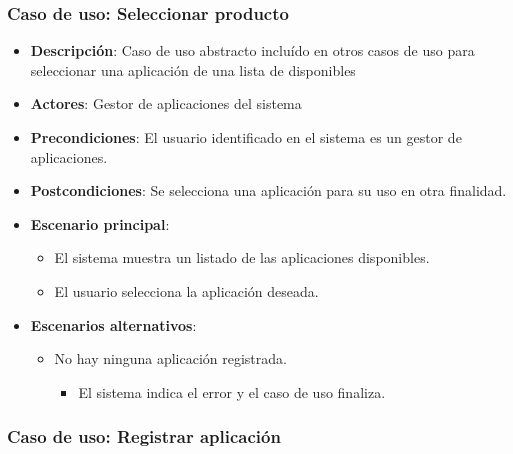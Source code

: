 \documentclass[12pt,a4paperpaper,]{report}
\providecommand{\tightlist}{%
  \setlength{\itemsep}{0pt}\setlength{\parskip}{0pt}}
\begin{document}
\subsubsection{Caso de uso: Seleccionar
producto}\label{caso-de-uso-seleccionar-producto}

\begin{itemize}
\tightlist
\item
  \textbf{Descripción}: Caso de uso abstracto incluído en otros casos de
  uso para seleccionar una aplicación de una lista de disponibles
\item
  \textbf{Actores}: Gestor de aplicaciones del sistema
\item
  \textbf{Precondiciones}: El usuario identificado en el sistema es un
  gestor de aplicaciones.
\item
  \textbf{Postcondiciones}: Se selecciona una aplicación para su uso en
  otra finalidad.
\item
  \textbf{Escenario principal}:

  \begin{itemize}
  \tightlist
  \item
    El sistema muestra un listado de las aplicaciones disponibles.
  \item
    El usuario selecciona la aplicación deseada.
  \end{itemize}
\item
  \textbf{Escenarios alternativos}:

  \begin{itemize}
  \tightlist
  \item
    No hay ninguna aplicación registrada.

    \begin{itemize}
    \tightlist
    \item
      El sistema indica el error y el caso de uso finaliza.
    \end{itemize}
  \end{itemize}
\end{itemize}

\subsubsection{Caso de uso: Registrar
aplicación}\label{caso-de-uso-registrar-aplicaciuxf3n}
\end{document}
